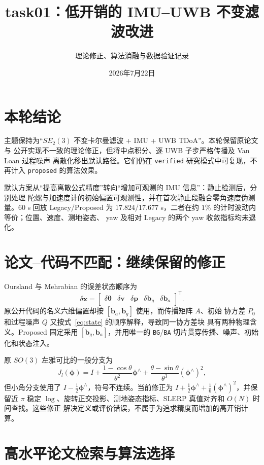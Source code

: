 \documentclass[11pt,a4paper]{ctexart}
\title{task01：低开销的 IMU--UWB 不变滤波改进}
\author{理论修正、算法消融与数据验证记录}
\date{2026年7月22日}
\begin{document}
\maketitle

\section{本轮结论}

主题保持为“$SE_2(3)$ 不变卡尔曼滤波 + IMU + UWB TDoA”。本轮保留原论文与
公开实现不一致的理论修正，但将中点积分、逐 UWB 子步严格传播及 Van Loan 过程噪声
离散化移出默认路径。它们仍在 \texttt{verified} 研究模式中可复现，不再计入
\texttt{proposed} 的算法效果。

默认方案从“提高离散公式精度”转向“增加可观测的 IMU 信息”：静止检测后，分别处理
陀螺与加速度计的初始偏置可观测性，并在首次静止段融合零角速度伪测量。60 s 回放
Legacy/Proposed 为 17.824/17.677 s，二者在约 $1\%$ 的计时波动内等价；位置、速度、测地姿态、
yaw 及相对 Legacy 的两个 yaw 收敛指标均未退化。

\section{论文--代码不匹配：继续保留的修正}

Oursland 与 Mehrabian 的误差状态顺序为
\begin{equation}
 \delta\bm{x}=\begin{bmatrix}
 \delta\bm\theta&\delta\bm v&\delta\bm p&\delta\bm b_g&\delta\bm b_a
 \end{bmatrix}^{\mathsf T}.
 \label{eq:state}
\end{equation}
原公开代码的名义六维偏置却按 $[\bm b_a,\bm b_g]$ 使用，而传播矩阵 $A$、初始
协方差 $P_0$ 和过程噪声 $Q$ 又按式~\eqref{eq:state} 的顺序解释，导致同一协方差块
具有两种物理含义。Proposed 固定采用 $[\bm b_g,\bm b_a]$，并用唯一的
\texttt{BG}/\texttt{BA} 切片贯穿传播、噪声、初始化和状态注入。

原 $SO(3)$ 左雅可比的一般分支为
\begin{equation}
 J_l(\bm\phi)=I+\frac{1-\cos\theta}{\theta^2}\bm\phi^\wedge
 +\frac{\theta-\sin\theta}{\theta^3}(\bm\phi^\wedge)^2,
\end{equation}
但小角分支使用了 $I-\frac12\bm\phi^\wedge$，符号不连续。当前修正为
$I+\frac12\bm\phi^\wedge+\frac16(\bm\phi^\wedge)^2$，并保留近 $\pi$ 稳定
$\log$、旋转正交投影、测地姿态指标、SLERP 真值对齐和 $O(N)$ 时间查找。这些修正
解决定义或评价错误，不属于为追求精度而增加的高开销计算。

\section{高水平论文检索与算法选择}
\end{document}
